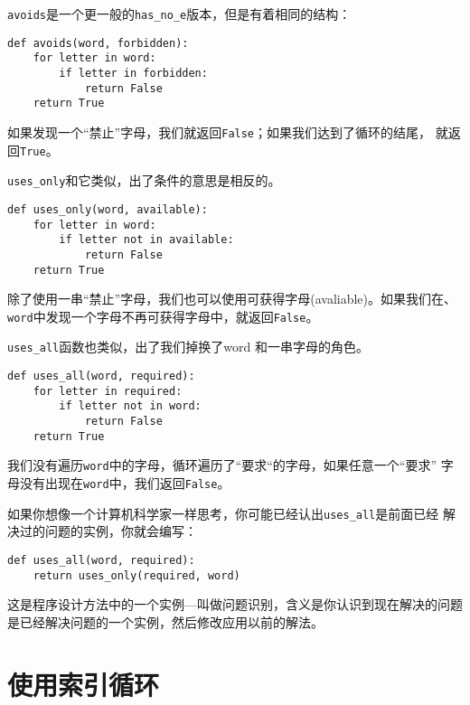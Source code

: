 {\tt avoids}是一个更一般的\verb"has_no_e"版本，但是有着相同的结构：

\beforeverb
\begin{verbatim}
def avoids(word, forbidden):
    for letter in word:
        if letter in forbidden:
            return False
    return True
\end{verbatim}
\afterverb

如果发现一个“禁止”字母，我们就返回{\tt False}；如果我们达到了循环的结尾，
就返回{\tt True}。

\verb"uses_only"和它类似，出了条件的意思是相反的。

\beforeverb
\begin{verbatim}
def uses_only(word, available):
    for letter in word: 
        if letter not in available:
            return False
    return True
\end{verbatim}
\afterverb

除了使用一串“禁止”字母，我们也可以使用可获得字母(avaliable)。如果我们在、
{\tt word}中发现一个字母不再可获得字母中，就返回{\tt False}。

\verb"uses_all"函数也类似，出了我们掉换了word 和一串字母的角色。
\beforeverb
\begin{verbatim}
def uses_all(word, required):
    for letter in required: 
        if letter not in word:
            return False
    return True
\end{verbatim}
\afterverb

我们没有遍历{\tt word}中的字母，循环遍历了“要求“的字母，如果任意一个“要求”
字母没有出现在{\tt word}中，我们返回{\tt False}。


如果你想像一个计算机科学家一样思考，你可能已经认出\verb"uses_all"是前面已经
解决过的问题的实例，你就会编写：

\beforeverb
\begin{verbatim}
def uses_all(word, required):
    return uses_only(required, word)
\end{verbatim}
\afterverb

这是程序设计方法中的一个实例---叫做问题识别，含义是你认识到现在解决的问题
是已经解决问题的一个实例，然后修改应用以前的解法。


\section{使用索引循环}

